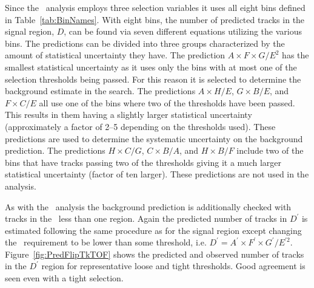 Since the \tktof\ analysis employs three selection variables it uses all eight bins defined in Table~\ref{tab:BinNames}.
With eight bins, the number of predicted tracks in the signal region, $D$, can be found via seven different equations utilizing the various bins.
The predictions can be divided into three groups characterized by the amount of statistical uncertainty they have.
The prediction $A\times F\times G/E^2$ has the smallest statistical uncertainty as it uses only the bins with at most one of the selection thresholds being passed.
For this reason it is selected to determine the background estimate in the search.
The predictions $A\times H / E$, $G\times B / E$, and $F\times C / E$ all use one of the bins where two of the thresholds have been passed.
This results in them having a slightly larger statistical uncertainty (approximately a factor of 2--5 depending on the thresholds used).
These predictions are used to determine the systematic uncertainty on the background prediction.
The predictions $H\times C / G$, $C\times B / A$, and $H\times B / F$ include two of the bins that have tracks passing two of the thresholds giving it a much larger
statistical uncertainty (factor of ten larger). These predictions are not used in the analysis.

As with the \muononly\ analysis the background prediction is additionally checked with tracks in the \invbeta\ less than one region. Again the predicted number of tracks in
$D^{\prime}$ is estimated following the same procedure as for the signal region except changing the \invbeta\ requirement to be lower than some threshold,
i.e. $D^{\prime} = A^{\prime}\times F^{\prime}\times G^{\prime} / E^{\prime 2}$.
Figure~\ref{fig:PredFlipTkTOF} shows the predicted and observed number of tracks in the $D^{\prime}$ region for representative loose and tight thresholds. 
Good agreement is seen even with a tight selection.

